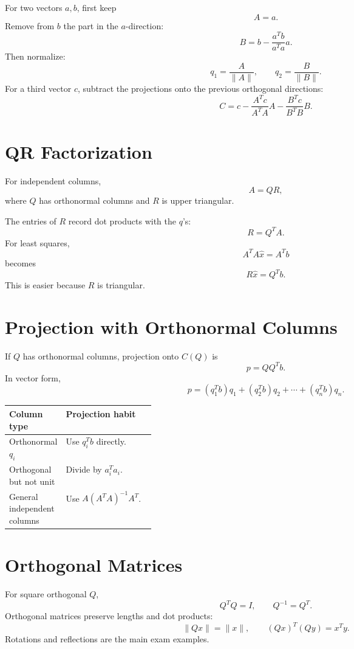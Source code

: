 \documentclass[10pt]{article}
\begin{document}
For two vectors \(a,b\), first keep
\[
A=a.
\]
Remove from \(b\) the part in the \(a\)-direction:
\[
B=b-\frac{a^{T}b}{a^{T}a}a.
\]
Then normalize:
\[
q_1=\frac{A}{\|A\|},
\qquad
q_2=\frac{B}{\|B\|}.
\]
For a third vector \(c\), subtract the projections onto the previous orthogonal directions:
\[
C=c-\frac{A^{T}c}{A^{T}A}A-\frac{B^{T}c}{B^{T}B}B.
\]


\section{QR Factorization}

For independent columns,
\[
A=QR,
\]
where \(Q\) has orthonormal columns and \(R\) is upper triangular.

The entries of \(R\) record dot products with the \(q\)'s:
\[
R=Q^{T}A.
\]
For least squares,
\[
A^{T}A\hat{x}=A^{T}b
\]
becomes
\[
R\hat{x}=Q^{T}b.
\]
This is easier because \(R\) is triangular.

\section{Projection with Orthonormal Columns}

If \(Q\) has orthonormal columns, projection onto \(C(Q)\) is
\[
p=QQ^{T}b.
\]
In vector form,
\[
p=(q_1^{T}b)q_1+(q_2^{T}b)q_2+\cdots+(q_n^{T}b)q_n.
\]

\begin{center}
\small
\begin{tabularx}{\linewidth}{@{}L{0.28\linewidth}Y@{}}
\toprule
Column type & Projection habit \\
\midrule
Orthonormal \(q_i\) & Use \(q_i^{T}b\) directly. \\
Orthogonal but not unit & Divide by \(a_i^{T}a_i\). \\
General independent columns & Use \(A(A^{T}A)^{-1}A^{T}\). \\
\bottomrule
\end{tabularx}
\end{center}

\section{Orthogonal Matrices}

For square orthogonal \(Q\),
\[
Q^{T}Q=I,
\qquad
Q^{-1}=Q^{T}.
\]
Orthogonal matrices preserve lengths and dot products:
\[
\|Qx\|=\|x\|,
\qquad
(Qx)^{T}(Qy)=x^{T}y.
\]
Rotations and reflections are the main exam examples.
\end{document}
